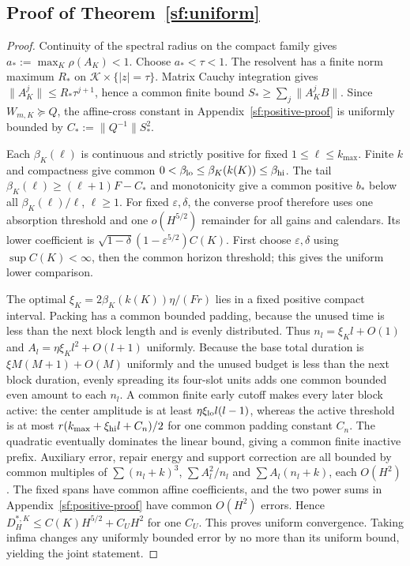 \documentclass[journal]{IEEEtran}
\begin{document}
\subsection{Proof of Theorem~\ref{sf:uniform}}
\begin{proof}\leavevmode
Continuity of the spectral radius on the compact family gives
$a_*:=\max_K\rho(A_K)<1$. Choose $a_*<\tau<1$.
The resolvent has a finite norm maximum $R_*$ on
$\mathcal K\times\{|z|=\tau\}$. Matrix Cauchy integration gives
$\|A_K^j\|\le R_*\tau^{j+1}$, hence a common finite bound
$S_*\ge\sum_j\|A_K^jB\|$.
Since $W_{m,K}\succeq Q$, the affine-cross constant in Appendix~\ref{sf:positive-proof} is
uniformly bounded by $C_*:=\|Q^{-1}\|S_*^2$.

Each $\beta_K(\ell)$ is continuous and strictly positive for fixed
$1\le\ell\le k_{\max}$. Finite $k$ and compactness give common
$0<\beta_{\rm lo}\le\beta_K(k(K))\le\beta_{\rm hi}$.
The tail $\beta_K(\ell)\ge(\ell+1)F-C_*$ and monotonicity give
a common positive $b_*$ below all $\beta_K(\ell)/\ell$, $\ell\ge1$.
For fixed $\varepsilon,\delta$, the converse proof therefore uses one
absorption threshold and one $o(H^{5/2})$ remainder for all gains and calendars.
Its lower coefficient is
$\sqrt{1-\delta}(1-\varepsilon^{5/2})C(K)$.
First choose $\varepsilon,\delta$ using $\sup C(K)<\infty$, then the common
horizon threshold; this gives the uniform lower comparison.

The optimal $\xi_K=2\beta_K(k(K))\eta/(Fr)$ lies in a fixed positive compact
interval. Packing has a common bounded padding, because the unused time is
less than the next block length and is evenly distributed.
Thus $n_l=\xi_Kl+O(1)$ and $A_l=\eta\xi_Kl^2+O(l+1)$ uniformly.
Because the base total duration is $\xi M(M+1)+O(M)$ uniformly and
the unused budget is less than the next block duration, evenly spreading
its four-slot units adds one common bounded even amount to each $n_l$.
A common finite early cutoff makes every later block active: the center amplitude is at least $\eta\xi_{\rm lo}l(l-1)$, whereas
the active threshold is at most $r(k_{\max}+\xi_{\rm hi}l+C_n)/2$
for one common padding constant $C_n$. The quadratic eventually dominates
the linear bound, giving a common finite inactive prefix. Auxiliary error, repair energy and support correction
are all bounded by common multiples of
$\sum(n_l+k)^3$, $\sum A_l^2/n_l$ and $\sum A_l(n_l+k)$, each $O(H^2)$.
The fixed spans have common affine coefficients, and the two power sums in
Appendix~\ref{sf:positive-proof} have common $O(H^2)$ errors. Hence
$D_H^{*,K}\le C(K)H^{5/2}+C_UH^2$ for one $C_U$.
This proves uniform convergence. Taking infima changes any uniformly bounded
error by no more than its uniform bound, yielding the joint statement.
\end{proof}
\end{document}
